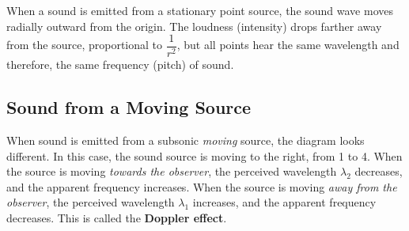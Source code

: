 When a sound is emitted from a stationary point source, the sound wave moves
radially outward from the origin. The loudness (intensity) drops farther away
from the source, proportional to $\dfrac1{r^2}$, but all points hear the same
wavelength and therefore, the same frequency (pitch) of sound.
\begin{figure}[ht]
  \centering
\end{figure}

%  
%
%
%
%
\subsection{Sound from a Moving Source}

When sound is emitted from a subsonic \emph{moving} source, the diagram looks
different. In this case, the sound source is moving to the right,
from 1 to 4. When the source is moving \emph{towards the observer}, the
perceived wavelength $\lambda_2$ decreases, and the apparent frequency
increases. When the source is moving \emph{away from the observer}, the
perceived wavelength $\lambda_1$ increases, and the apparent frequency
decreases. This is called the \textbf{Doppler effect}.
\begin{figure}[ht]
  \centering
\end{figure}     

